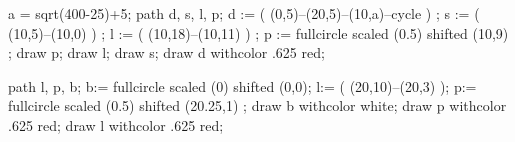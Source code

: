 %
\def\C{\complexes}
\def\R{\reals}
\def\Q{\rationals}
\def\Z{\integers}
\def\N{\naturalnumbers}
\def\P{\primes}
\def\F{\blackboard{F}}
\def\Fam{{\cal F}}
\def\O{{\cal O}}

%
\def\stackrelo#1#2{\mathrel{\mathop{#1}\limits^{\small #2}}}
\def\stackrelu#1#2{\mathrel{\mathop{#1}\limits^{\small #2}}}

%
\def\abs#1{\left| #1 \right|}
\def\norm#1{\left|\left| #1 \right|\right|}
\def\ord{{\rm ord}}
\def\Log{{\rm Log}}
\def\ZZ{$Z\mkern-16mu_{\textstyle Z}\mkern5mu$}
\def\Res{{\rm Res}}
\def\div{{\rm div}}
\def\dim{{\rm dim}}
\def\core{{\rm kern}}
\def\bild{{\rm bild}}
\def\grad{{\rm grad}}

%
\def\lightning{\symbol[wasy general][lightning]}
\def\iddots{\mirror{\ddots}}
%


%
\def\warning{\inmargin{\reuseMPgraphic{achtung}}\underbar{Vorsicht:}}
a = sqrt(400-25)+5;
path d, s, l, p;
d := ( (0,5)--(20,5)--(10,a)--cycle )  ;
s := ( (10,5)--(10,0) ) ;
l := ( (10,18)--(10,11) ) ;
p := fullcircle scaled (0.5) shifted (10,9) ; 
draw p;
draw l;
draw s;
draw d withcolor .625 red;
\stopreusableMPgraphic

\def\notice{\inmargin{\reuseMPgraphic{hinweis}}\underbar{Hinweis: }}
path l, p, b;
b:= fullcircle scaled (0) shifted (0,0);
l:= ( (20,10)--(20,3) );
p:= fullcircle scaled (0.5) shifted (20.25,1) ;
draw b withcolor white;
draw p withcolor .625 red;
draw l withcolor .625 red;
\stopreusableMPgraphic

%
\definecolor[bordeauxred][c=.34, m=.92, y=.64, k=.34]
\definecolor[darkblue][c=1,m=.99,y=0,k=.32]
\definecolor[TEone][c=0,m=.75,y=.51,k=.7]
\definecolor[TEtwo][c=0,m=.19,y=.96,k=.81]
\definecolor[TEthree][c=0,m=0,y=0,k=.77]
\definecolor[TEfive][c=.53,m=.97,y=0,k=.62]

%

